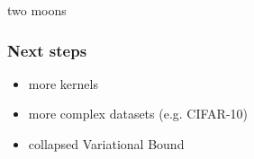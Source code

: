 \documentclass{beamer}
\begin{document}
        
        \begin{frame}
            two moons
        \end{frame}

        \begin{frame}
            \frametitle{Next steps}
            \begin{itemize}
                \item more kernels
                \item more complex datasets (e.g. CIFAR-10)
                \item collapsed Variational Bound
            \end{itemize}
        \end{frame}



\end{document}
